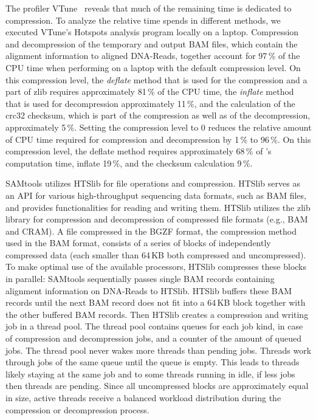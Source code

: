 The profiler VTune~\cite{noauthor_fix_nodate} reveals that much of the remaining time is dedicated to compression. To analyze the relative time \sort spends in different methods, we executed VTune's Hotspots analysis program locally on a laptop.
Compression and decompression of the temporary and output BAM files, which contain the alignment information to aligned DNA-Reads, together account for 97\,\% of the CPU time when performing \sort on a laptop with the default compression level. On this compression level, the \textit{deflate} method that is used for the compression and a part of zlib requires approximately 81\,\% of the CPU time, the \textit{inflate} method that is used for decompression approximately 11\,\%, and the calculation of the crc32 checksum, which is part of the compression as well as of the decompression, approximately 5\,\%. Setting the compression level to 0 reduces the relative amount of CPU time required for compression and decompression by 1\,\% to 96\,\%. On this compression level, the deflate method requires approximately 68\,\% of \sort's computation time, inflate 19\,\%, and the checksum calculation 9\,\%.

SAMtools utilizes HTSlib for file operations and compression. HTSlib serves as an API for various high-throughput sequencing data formats, such as BAM files, and  provides functionalities for reading and writing them. HTSlib utilizes the zlib library for compression and decompression of compressed file formats (e.g., BAM and CRAM). A file compressed in the BGZF format, the compression method used in the BAM format, consists of a series of blocks of independently compressed data (each smaller than 64\,KB both compressed and uncompressed). To make optimal use of the available processors, HTSlib compresses these blocks in parallel: SAMtools sequentially passes single BAM records containing alignment information on DNA-Reads to HTSlib. HTSlib buffers these BAM records until the next BAM record does not fit into a 64\,KB block together with the other buffered BAM records. Then HTSlib creates a compression and writing job in a thread pool. The thread pool contains queues for each job kind, in case of \sort compression and decompression jobs, and a counter of the amount of queued jobs. The thread pool never wakes more threads than pending jobs. Threads work through jobs of the same queue until the queue is empty. This leads to threads likely staying at the same job and to some threads running in idle, if less jobs then threads are pending. Since all uncompressed blocks are approximately equal in size, active threads receive a balanced workload distribution during the compression or decompression process.


